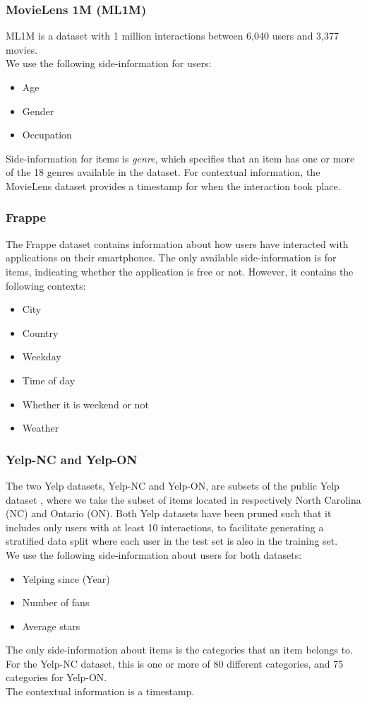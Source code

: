 \subsubsection*{MovieLens 1M (ML1M)}
ML1M is a dataset \cite{ml1m} with 1 million interactions between 6,040 users and 3,377 movies.\\
We use the following side-information for users:
\begin{itemize}
    \item Age
    \item Gender
    \item Occupation
\end{itemize}
Side-information for items is \textit{genre}, which specifies that an item has one or more of the 18 genres available in the dataset.
For contextual information, the MovieLens dataset provides a timestamp for when the interaction took place.

\subsubsection*{Frappe}
The Frappe dataset \cite{baltrunasfrappe} contains information about how users have interacted with applications on their smartphones.
The only available side-information is for items, indicating whether the application is free or not.
However, it contains the following contexts:
\begin{itemize}
    \item City
    \item Country
    \item Weekday
    \item Time of day
    \item Whether it is weekend or not
    \item Weather
\end{itemize}

\subsubsection*{Yelp-NC and Yelp-ON}
The two Yelp datasets, Yelp-NC and Yelp-ON, are subsets of the public Yelp dataset \cite{yelp}, where we take the subset of items located in respectively North Carolina (NC) and Ontario (ON).
Both Yelp datasets have been pruned such that it includes only users with at least 10 interactions, to facilitate generating a stratified data split where each user in the test set is also in the training set.\\
We use the following side-information about users for both datasets:
\begin{itemize}
    \item Yelping since (Year)
    \item Number of fans
    \item Average stars
\end{itemize}
The only side-information about items is the categories that an item belongs to.
For the Yelp-NC dataset, this is one or more of 80 different categories, and 75 categories for Yelp-ON.\\
The contextual information is a timestamp.


